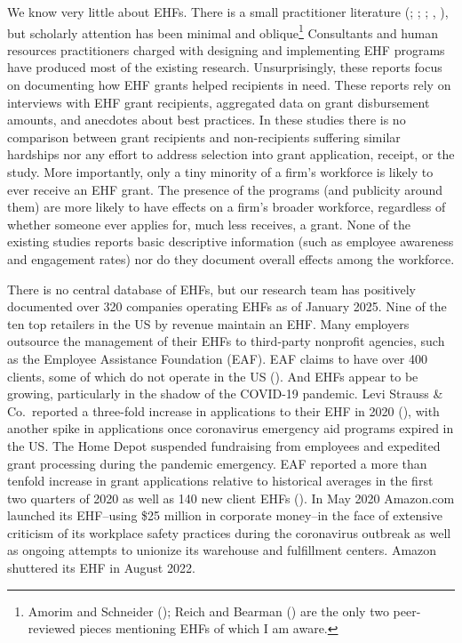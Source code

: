 \documentclass[
  11pt,
  oneside]{article}
\begin{document}
We know very little about EHFs. There is a small practitioner literature (; ; ; , ), but scholarly attention has been minimal and oblique\footnote{Amorim and Schneider (); Reich and Bearman () are the only two peer-reviewed pieces mentioning EHFs of which I am aware.} Consultants and human resources practitioners charged with designing and implementing EHF programs have produced most of the existing research. Unsurprisingly, these reports focus on documenting how EHF grants helped recipients in need. These reports rely on interviews with EHF grant recipients, aggregated data on grant disbursement amounts, and anecdotes about best practices. In these studies there is no comparison between grant recipients and non-recipients suffering similar hardships nor any effort to address selection into grant application, receipt, or the study. More importantly, only a tiny minority of a firm's workforce is likely to ever receive an EHF grant. The presence of the programs (and publicity around them) are more likely to have effects on a firm's broader workforce, regardless of whether someone ever applies for, much less receives, a grant. None of the existing studies reports basic descriptive information (such as employee awareness and engagement rates) nor do they document overall effects among the workforce.

There is no central database of EHFs, but our research team has positively documented over 320 companies operating EHFs as of January 2025. Nine of the ten top retailers in the US by revenue maintain an EHF. Many employers outsource the management of their EHFs to third-party nonprofit agencies, such as the Employee Assistance Foundation (EAF). EAF claims to have over 400 clients, some of which do not operate in the US (). And EHFs appear to be growing, particularly in the shadow of the COVID-19 pandemic. Levi Strauss \& Co.~reported a three-fold increase in applications to their EHF in 2020 (), with another spike in applications once coronavirus emergency aid programs expired in the US. The Home Depot suspended fundraising from employees and expedited grant processing during the pandemic emergency. EAF reported a more than tenfold increase in grant applications relative to historical averages in the first two quarters of 2020 as well as 140 new client EHFs (). In May 2020 Amazon.com launched its EHF--using \$25 million in corporate money--in the face of extensive criticism of its workplace safety practices during the coronavirus outbreak as well as ongoing attempts to unionize its warehouse and fulfillment centers. Amazon shuttered its EHF in August 2022.
\end{document}
